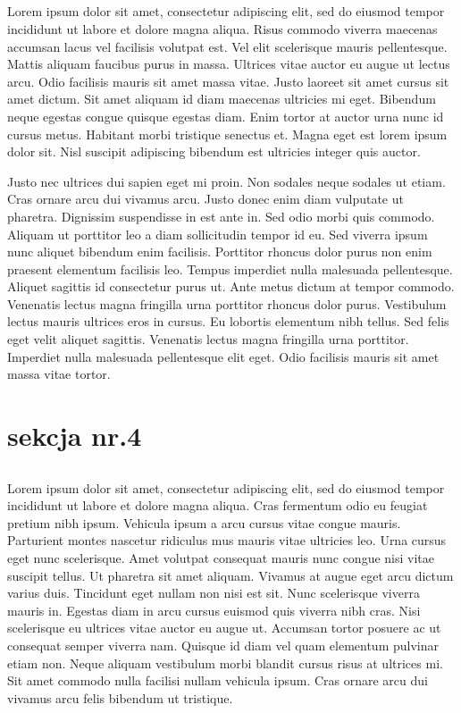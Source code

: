 \documentclass{book}
\begin{document}
\subsection{}
Lorem ipsum dolor sit amet, consectetur adipiscing elit, sed do eiusmod tempor incididunt ut labore et dolore magna aliqua. Risus commodo viverra maecenas accumsan lacus vel facilisis volutpat est. Vel elit scelerisque mauris pellentesque. Mattis aliquam faucibus purus in massa. Ultrices vitae auctor eu augue ut lectus arcu. Odio facilisis mauris sit amet massa vitae. Justo laoreet sit amet cursus sit amet dictum. Sit amet aliquam id diam maecenas ultricies mi eget. Bibendum neque egestas congue quisque egestas diam. Enim tortor at auctor urna nunc id cursus metus. Habitant morbi tristique senectus et. Magna eget est lorem ipsum dolor sit. Nisl suscipit adipiscing bibendum est ultricies integer quis auctor.

Justo nec ultrices dui sapien eget mi proin. Non sodales neque sodales ut etiam. Cras ornare arcu dui vivamus arcu. Justo donec enim diam vulputate ut pharetra. Dignissim suspendisse in est ante in. Sed odio morbi quis commodo. Aliquam ut porttitor leo a diam sollicitudin tempor id eu. Sed viverra ipsum nunc aliquet bibendum enim facilisis. Porttitor rhoncus dolor purus non enim praesent elementum facilisis leo. Tempus imperdiet nulla malesuada pellentesque. Aliquet sagittis id consectetur purus ut. Ante metus dictum at tempor commodo. Venenatis lectus magna fringilla urna porttitor rhoncus dolor purus. Vestibulum lectus mauris ultrices eros in cursus. Eu lobortis elementum nibh tellus. Sed felis eget velit aliquet sagittis. Venenatis lectus magna fringilla urna porttitor. Imperdiet nulla malesuada pellentesque elit eget. Odio facilisis mauris sit amet massa vitae tortor.
\section{sekcja nr.4}
\lipsum
\lipsum[2-10]
\subsection{}
Lorem ipsum dolor sit amet, consectetur adipiscing elit, sed do eiusmod tempor incididunt ut labore et dolore magna aliqua. Cras fermentum odio eu feugiat pretium nibh ipsum. Vehicula ipsum a arcu cursus vitae congue mauris. Parturient montes nascetur ridiculus mus mauris vitae ultricies leo. Urna cursus eget nunc scelerisque. Amet volutpat consequat mauris nunc congue nisi vitae suscipit tellus. Ut pharetra sit amet aliquam. Vivamus at augue eget arcu dictum varius duis. Tincidunt eget nullam non nisi est sit. Nunc scelerisque viverra mauris in. Egestas diam in arcu cursus euismod quis viverra nibh cras. Nisi scelerisque eu ultrices vitae auctor eu augue ut. Accumsan tortor posuere ac ut consequat semper viverra nam. Quisque id diam vel quam elementum pulvinar etiam non. Neque aliquam vestibulum morbi blandit cursus risus at ultrices mi. Sit amet commodo nulla facilisi nullam vehicula ipsum. Cras ornare arcu dui vivamus arcu felis bibendum ut tristique.
\end{document}
